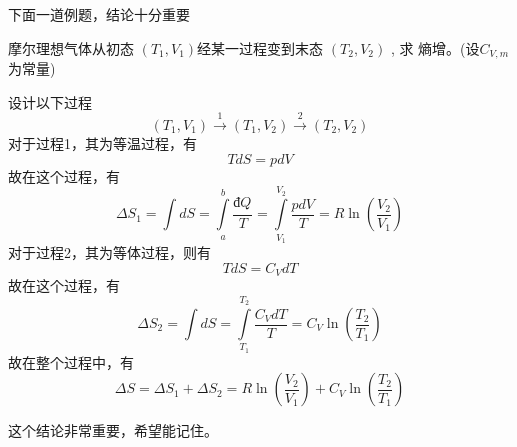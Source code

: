 \documentclass[lang=cn,10pt]{elegantbook}
\begin{document}
	下面一道例题，结论十分重要
	\begin{example}
		摩尔理想气体从初态  $(T_{1}, V_{1})$经某一过程变到末态  $(T_{2}, V_{2})$ , 求 熵增。(设$C_{V,m}$为常量)
	\end{example}
	\begin{solution}
		设计以下过程
		\begin{equation*}
			\left( T_1,V_1 \right) \xrightarrow{1}\left( T_1,V_2 \right) \xrightarrow{2}\left( T_2,V_2 \right) 
		\end{equation*}
		对于过程1，其为等温过程，有
		\begin{equation*}
			TdS=pdV
		\end{equation*}
		故在这个过程，有
		\begin{equation*}
			\varDelta S_{1}=\int dS=\int\limits_a^b{\frac{\text{đ}Q_{}}{T}}=\int\limits_{V_1}^{V_2}{\frac{pdV}{T}}=R\ln(\frac{V_{2}}{V_{1}})
		\end{equation*}
		对于过程2，其为等体过程，则有
		\begin{equation*}
			TdS=C_{V}dT
		\end{equation*}
		故在这个过程，有
		\begin{equation*}
			\varDelta S_{2}=\int dS=\int\limits_{T_1}^{T_2}{\frac{C_VdT}{T}}=C_{V}\ln(\frac{T_{2}}{T_{1}})
		\end{equation*}
		故在整个过程中，有
		\begin{equation*}
				\varDelta S=\varDelta S_{1}+\varDelta S_{2}=R\ln(\frac{V_{2}}{V_{1}})+C_{V}\ln(\frac{T_{2}}{T_{1}})
		\end{equation*}
	\end{solution}
	这个结论非常重要，希望能记住。
\end{document}
